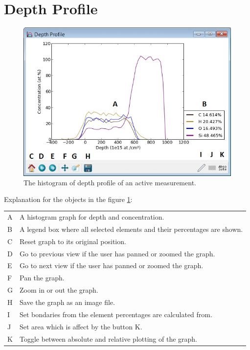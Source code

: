 \documentclass{scrreprt}
\begin{document}
\section{Depth Profile}\label{measurementtab-depth}
\begin{figure}[H]
\centering
\includegraphics[width=140mm]{measurement-depth}
\caption{The histogram of depth profile of an active measurement.}
\label{fig-depth}
\end{figure}
Explanation for the objects in the figure \ref{fig-depth}:

\begin{tabular}{ll}
A & A histogram graph for depth and concentration.\\
B & A legend box where all selected elements and their percentages are shown.\\
C & Reset graph to its original position.\\
D & Go to previous view if the user has panned or zoomed the graph.\\
E & Go to next view if the user has panned or zoomed the graph.\\
F & Pan the graph.\\
G & Zoom in or out the graph.\\
H & Save the graph as an image file.\\
I & Set bondaries from the element percentages are calculated from.\\
J & Set area which is affect by the button K.\\
K & Toggle between absolute and relative plotting of the graph.\\
\end{tabular}
\end{document}
